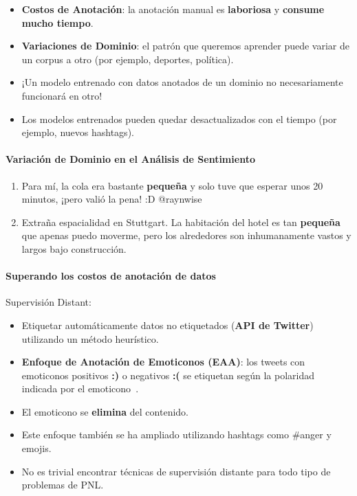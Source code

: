 \begin{itemize}
   \item \textbf{Costos de Anotación}: la anotación manual es \textbf{laboriosa} y \textbf{consume mucho tiempo}.
   \item \textbf{Variaciones de Dominio}: el patrón que queremos aprender puede variar de un corpus a otro (por ejemplo, deportes, política).

   \item ¡Un modelo entrenado con datos anotados de un dominio no necesariamente funcionará en otro!
   \item Los modelos entrenados pueden quedar desactualizados con el tiempo (por ejemplo, nuevos hashtags).
\end{itemize}

\paragraph{Variación de Dominio en el Análisis de Sentimiento}
\begin{enumerate}
   \item Para mí, la cola era bastante \textcolor[rgb]{0.00,0.00,1.00}{\textbf{pequeña}} y solo tuve que esperar unos 20 minutos, ¡pero valió la pena! :D @raynwise
   \item Extraña espacialidad en Stuttgart. La habitación del hotel es tan \textcolor[rgb]{1.00,0.00,0.00}{\textbf{pequeña}} que apenas puedo moverme, pero los alrededores son inhumanamente vastos y largos bajo construcción.
\end{enumerate}

\paragraph{Superando los costos de anotación de datos}
Supervisión Distant:
\begin{itemize}
   \item Etiquetar automáticamente datos no etiquetados (\textbf{API de Twitter}) utilizando un método heurístico.
   \item \textbf{Enfoque de Anotación de Emoticonos (EAA)}: los tweets con emoticonos positivos \textcolor[rgb]{0.00,0.00,1.00}{\textbf{:)}} o negativos \textcolor[rgb]{1.00,0.00,0.00}{\textbf{:(}} se etiquetan según la polaridad indicada por el emoticono~\cite{Read2005}.
   \item El emoticono se \textbf{elimina} del contenido.
   \item Este enfoque también se ha ampliado utilizando hashtags como \#anger y emojis.
   \item No es trivial encontrar técnicas de supervisión distante para todo tipo de problemas de PNL.
\end{itemize}


